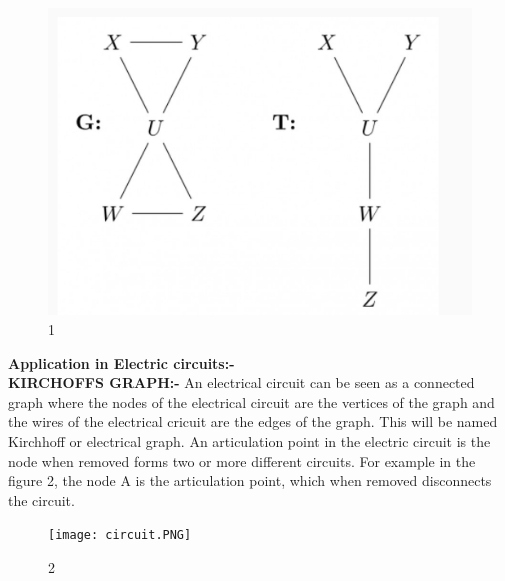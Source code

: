 \documentclass[journal,12pt,twocolumn]{IEEEtran}
\begin{document}
\begin{figure}
    \centering
    \includegraphics[scale=0.6]{assignment1.png}
    \caption{1}
    \label{fig: figure1}
\end{figure}
\textbf{Application in Electric circuits:-}\\
\textbf{KIRCHOFFS GRAPH:-}
An electrical circuit can be seen as a connected graph where the nodes of the
electrical circuit are the vertices of the graph and the wires of the electrical cricuit
are the edges of the graph. This will be named Kirchhoff or electrical graph. 
An articulation point in the electric circuit is the node when removed forms two or more different circuits. For example in the figure 2, the node A is the articulation point, which when removed disconnects the circuit.
\begin{figure}
    \centering
    \texttt{[image: circuit.PNG]}
    \caption{2}
    \label{fig:figure2}
\end{figure}
\\
\end{document}

